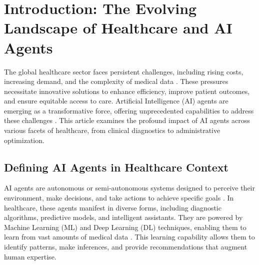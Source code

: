 \documentclass[12pt,a4paper]{article}
\begin{document}
\newpage
\tableofcontents
\newpage

\begin{abstract}
The integration of AI agents into healthcare represents a significant advancement, promising to transform various aspects of medical practice. This article explores the transformative potential and inherent challenges of these technologies. It delves into their applications, ranging from enhancing diagnostic accuracy and personalizing treatment plans to optimizing administrative tasks and improving patient engagement. The capacity of AI agents to process vast datasets and identify complex patterns beyond human capabilities is emphasized. This leads to increased efficiency, accuracy, and accessibility within the medical ecosystem. The article also addresses the critical importance of ethical considerations, including data privacy, algorithmic bias, and accountability for errors. Furthermore, it highlights the necessity of robust regulatory frameworks and transparent algorithmic design to ensure the safe and trustworthy deployment of AI agents. The overarching argument is that while AI agents offer unprecedented opportunities, their successful and ethical implementation requires a human-centered approach that prioritizes patient safety and clinician collaboration over full automation. This balanced perspective is crucial for realizing the full benefits of AI in healthcare.
\end{abstract}

\section{Introduction: The Evolving Landscape of Healthcare and AI Agents}
The global healthcare sector faces persistent challenges, including rising costs, increasing demand, and the complexity of medical data \cite{who2021ai}. These pressures necessitate innovative solutions to enhance efficiency, improve patient outcomes, and ensure equitable access to care. Artificial Intelligence (AI) agents are emerging as a transformative force, offering unprecedented capabilities to address these challenges \cite{topol2019highperformance}. This article examines the profound impact of AI agents across various facets of healthcare, from clinical diagnostics to administrative optimization.

\subsection{Defining AI Agents in Healthcare Context}
AI agents are autonomous or semi-autonomous systems designed to perceive their environment, make decisions, and take actions to achieve specific goals \cite{russell2010artificial}. In healthcare, these agents manifest in diverse forms, including diagnostic algorithms, predictive models, and intelligent assistants. They are powered by Machine Learning (ML) and Deep Learning (DL) techniques, enabling them to learn from vast amounts of medical data \cite{lecun2015deep}. This learning capability allows them to identify patterns, make inferences, and provide recommendations that augment human expertise.
\end{document}
